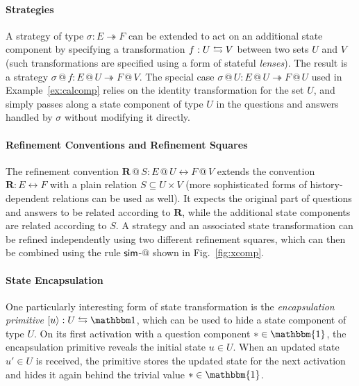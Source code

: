 \paragraph{Strategies}

A strategy of type $\sigma : E \twoheadrightarrow F$
can be extended to act on an additional state component
by specifying a transformation $f : U \leftrightarrows V$
between two sets $U$ and $V$
(such transformations are specified using a form of stateful \emph{lenses}).
The result is a strategy
$\sigma \mathbin@ f : E \mathbin@ U \twoheadrightarrow F \mathbin@ V$.
The special case
$\sigma \mathbin@ U : E \mathbin@ U \twoheadrightarrow F \mathbin@ U$
used in Example~\ref{ex:calcomp}
relies on the identity transformation for the set $U$,
and simply passes along a state component of type $U$
in the questions and answers handled by $\sigma$
without modifying it directly.

\paragraph{Refinement Conventions and Refinement Squares}

The refinement convention
$\mathbf{R} \mathbin@ S : E \mathbin@ U \leftrightarrow F \mathbin@ V$
extends the convention $\mathbf{R} : E \leftrightarrow F$
with a plain relation $S \subseteq U \times V$
(more sophisticated forms of history-dependent relations can be used as well).
It expects the original part of questions and answers
to be related according to $\mathbf{R}$,
while the additional state components are related according to $S$.
A strategy and an associated state transformation 
can be refined independently
using two different refinement squares,
which can then be combined using the rule $ \mathsf{sim} $-$@$
shown in Fig.~\ref{fig:xcomp}.

\paragraph{State Encapsulation}

One particularly interesting form of state transformation
is the \emph{encapsulation primitive}
$[u\rangle : U \lensarrow \mathbbm1$,
which can be used to hide a state component of type $U$.
On its first activation with a question component ${*} \in \mathbbm{1}$,
the encapsulation primitive reveals the initial state $u \in U$.
When an updated state $u' \in U$ is received,
the primitive stores the updated state for the next activation
and hides it again behind the trivial value ${*} \in \mathbbm{1}$.

